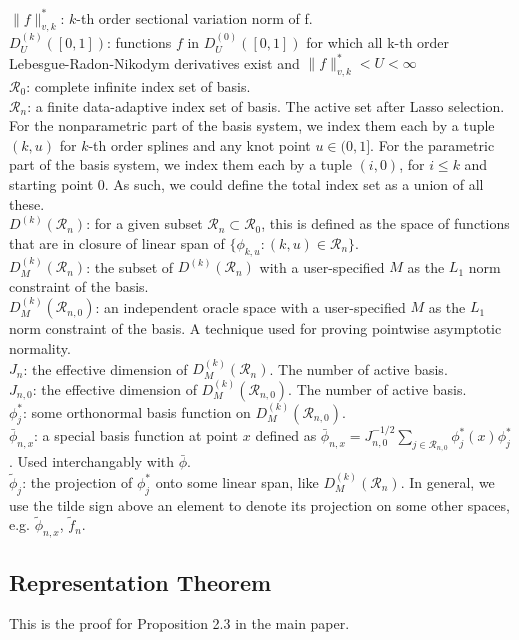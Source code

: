 $\| f \|_{v,k}^*$: $k$-th order sectional variation norm of f.\\
$D^{(k)}_U([0, 1])$: functions $f$ in $D^{(0)}_U([0, 1])$ for which all k-th order Lebesgue-Radon-Nikodym derivatives exist and $\| f \|_{v,k}^* < U < \infty$\\
$\mathcal{R}_0$: complete infinite index set of basis.\\
$\mathcal{R}_n$: a finite data-adaptive index set of basis. The active set after Lasso selection. For the nonparametric part of the basis system, we index them each by a tuple $(k, u)$ for $k$-th order splines and any knot point $u \in (0,1]$. For the parametric part of the basis system, we index them each by a tuple $(i, 0)$, for $i \leq k$ and starting point 0. As such, we could define the total index set as a union of all these. \\
$D^{(k)}(\mathcal{R}_n)$: for a given subset $\mathcal{R}_n \subset \mathcal{R}_0$, this is defined as the space of functions that are in closure of linear span of $\{\phi_{k,u} : (k, u) \in \mathcal{R}_n\}$. \\
$D^{(k)}_M(\mathcal{R}_n)$: the subset of $D^{(k)}(\mathcal{R}_n)$ with a user-specified $M$ as the $L_1$ norm constraint of the basis.\\
$D^{(k)}_M(\mathcal{R}_{n,0})$: an independent oracle space with a user-specified $M$ as the $L_1$ norm constraint of the basis. A technique used for proving pointwise asymptotic normality.\\
$J_n$: the effective dimension of $D^{(k)}_M(\mathcal{R}_n)$. The number of active basis. \\
$J_{n,0}$: the effective dimension of $D^{(k)}_M(\mathcal{R}_{n,0})$. The number of active basis. \\
$\phi_j^*$: some orthonormal basis function on $D^{(k)}_M(\mathcal{R}_{n,0})$.\\
$\bar \phi_{n,x}$: a special basis function at point $x$ defined as $\bar \phi_{n,x} = J_{n,0}^{-1/2} \sum_{j \in \mathcal{R}_{n,0}} \phi_j^*(x) \phi_j^*$. Used interchangably with $\bar \phi$.\\
$\tilde \phi_j$: the projection of $\phi_j^*$ onto some linear span, like $D^{(k)}_M(\mathcal{R}_n)$. In general, we use the tilde sign above an element to denote its projection on some other spaces, e.g. $\tilde \phi_{n,x}$, $\tilde f_n$.\\




\subsection{Representation Theorem} \label{App:representation thm}
This is the proof for Proposition 2.3 in the main paper.

